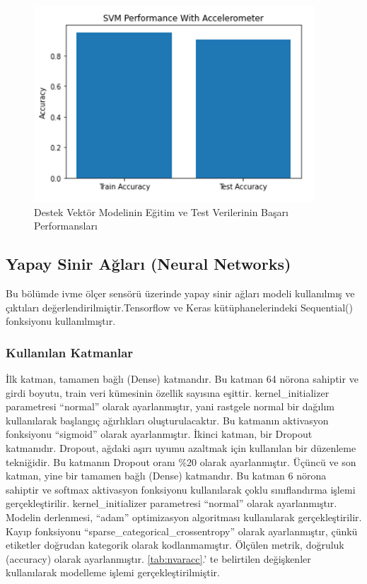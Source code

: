 \documentclass[12pt,twoside]{deuthesis}
\begin{document}
\begin{figure}

{\centering \includegraphics[width=0.6\linewidth,height=0.25\textheight]{figure/isvm_testtrain} 

}

\caption{Destek Vektör Modelinin Eğitim ve Test Verilerinin Başarı Performansları}\label{fig:isvmtesttrain}
\end{figure}
\hypertarget{yapay-sinir-aux11flarux131-neural-networks-1}{%
\subsection{Yapay Sinir Ağları (Neural Networks)}\label{yapay-sinir-aux11flarux131-neural-networks-1}}

Bu bölümde ivme ölçer sensörü üzerinde yapay sinir ağları modeli kullanılmış ve çıktıları değerlendirilmiştir.Tensorflow ve Keras kütüphanelerindeki Sequential() fonksiyonu kullanılmıştır.

\hypertarget{kullanux131lan-katmanlar-1}{%
\subsubsection{Kullanılan Katmanlar}\label{kullanux131lan-katmanlar-1}}

İlk katman, tamamen bağlı (Dense) katmandır. Bu katman 64 nörona sahiptir ve girdi boyutu, train veri kümesinin özellik sayısına eşittir. kernel\_initializer parametresi ``normal'' olarak ayarlanmıştır, yani rastgele normal bir dağılım kullanılarak başlangıç ağırlıkları oluşturulacaktır. Bu katmanın aktivasyon fonksiyonu ``sigmoid'' olarak ayarlanmıştır.
İkinci katman, bir Dropout katmanıdır. Dropout, ağdaki aşırı uyumu azaltmak için kullanılan bir düzenleme tekniğidir. Bu katmanın Dropout oranı \%20 olarak ayarlanmıştır.
Üçüncü ve son katman, yine bir tamamen bağlı (Dense) katmandır. Bu katman 6 nörona sahiptir ve softmax aktivasyon fonksiyonu kullanılarak çoklu sınıflandırma işlemi gerçekleştirilir. kernel\_initializer parametresi ``normal'' olarak ayarlanmıştır.
Modelin derlenmesi, ``adam'' optimizasyon algoritması kullanılarak gerçekleştirilir. Kayıp fonksiyonu ``sparse\_categorical\_crossentropy'' olarak ayarlanmıştır, çünkü etiketler doğrudan kategorik olarak kodlanmamıştır. Ölçülen metrik, doğruluk (accuracy) olarak ayarlanmıştır.
\ref{tab:nvaracc}.' te belirtilen değişkenler kullanılarak modelleme işlemi gerçekleştirilmiştir.
\end{document}
